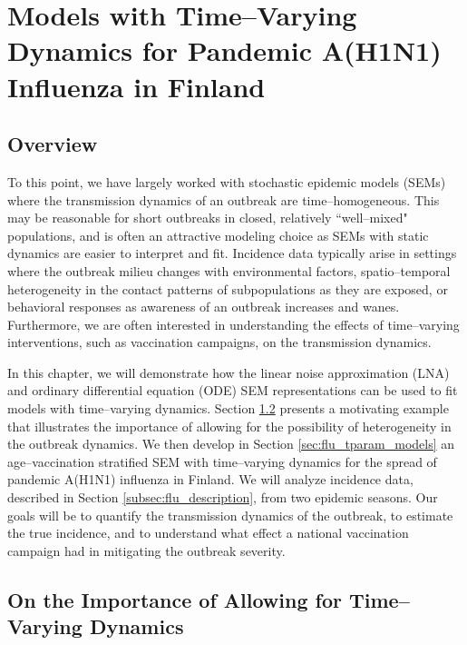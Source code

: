 \chapter{Models with Time--Varying Dynamics for Pandemic A(H1N1) Influenza in Finland}
\label{chap:lna_extensions}

\section{Overview}
\label{sec:lna_extensions_overview}
To this point, we have largely worked with stochastic epidemic models (SEMs) where the transmission dynamics of an outbreak are time--homogeneous. This may be reasonable for short outbreaks in closed, relatively ``well--mixed" populations, and is often an attractive modeling choice as SEMs with static dynamics are easier to interpret and fit. Incidence data typically arise in settings where the outbreak milieu changes with environmental factors, spatio--temporal heterogeneity in the contact patterns of subpopulations as they are exposed, or behavioral responses as awareness of an outbreak increases and wanes. Furthermore, we are often interested in understanding the effects of time--varying interventions, such as vaccination campaigns, on the transmission dynamics. 

In this chapter, we will demonstrate how the linear noise approximation (LNA) and ordinary differential equation (ODE) SEM representations can be used to fit models with time--varying dynamics. Section \ref{sec:tparam_motivation} presents a motivating example that illustrates the importance of allowing for the possibility of heterogeneity in the outbreak dynamics. We then develop in Section \ref{sec:flu_tparam_models} an age--vaccination stratified SEM with time--varying dynamics for the spread of pandemic A(H1N1) influenza in Finland. We will analyze incidence data, described in Section \ref{subsec:flu_description}, from two epidemic seasons. Our goals will be to quantify the transmission dynamics of the outbreak, to estimate the true incidence, and to understand what effect a national vaccination campaign had in mitigating the outbreak severity. 

\section{On the Importance of Allowing for Time--Varying Dynamics}
\label{sec:tparam_motivation}

